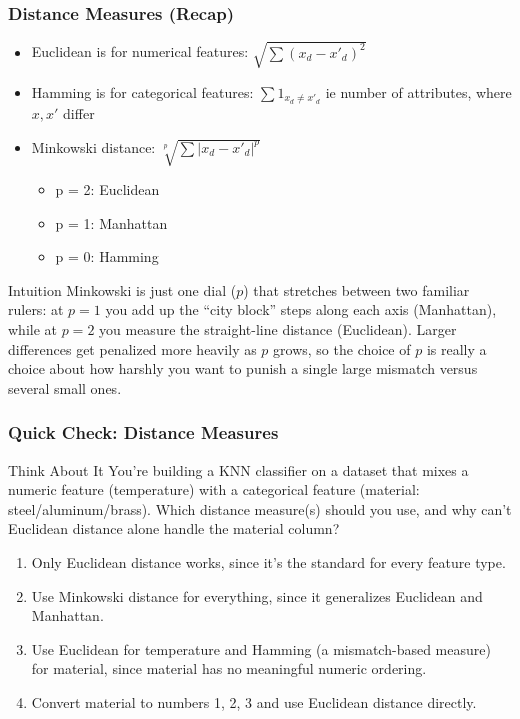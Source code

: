 \begin{frame}[fragile]\frametitle{Distance Measures (Recap)}
\begin{itemize}
\item Euclidean is for numerical features: $\sqrt{\sum (x_d - x'_d)^2}$
\item Hamming is for categorical features: $\sum 1_{x_d \neq x'_d}$ ie  number of attributes, where $x, x'$  differ 
\item Minkowski distance:  $\sqrt[p]{\sum |x_d - x'_d|^p}$
	\begin{itemize}
	\item p = 2: Euclidean
	\item p = 1: Manhattan
	\item p = 0: Hamming
	\end{itemize}
\end{itemize}

\begin{block}{Intuition}
Minkowski is just one dial ($p$) that stretches between two familiar rulers: at $p=1$ you
add up the ``city block'' steps along each axis (Manhattan), while at $p=2$ you measure the
straight-line distance (Euclidean). Larger differences get penalized more heavily as $p$
grows, so the choice of $p$ is really a choice about how harshly you want to punish a single
large mismatch versus several small ones.
\end{block}
\end{frame}

\begin{frame}[fragile]\frametitle{Quick Check: Distance Measures}
\begin{block}{Think About It}
You're building a KNN classifier on a dataset that mixes a numeric feature (temperature)
with a categorical feature (material: steel/aluminum/brass). Which distance measure(s)
should you use, and why can't Euclidean distance alone handle the material column?
\begin{enumerate}
  \item[A.] Only Euclidean distance works, since it's the standard for every feature type.
  \item[B.] Use Minkowski distance for everything, since it generalizes Euclidean and Manhattan.
  \item[C.] Use Euclidean for temperature and Hamming (a mismatch-based measure) for material,
  since material has no meaningful numeric ordering.
  \item[D.] Convert material to numbers 1, 2, 3 and use Euclidean distance directly.
\end{enumerate}
\end{block}
\end{frame}

